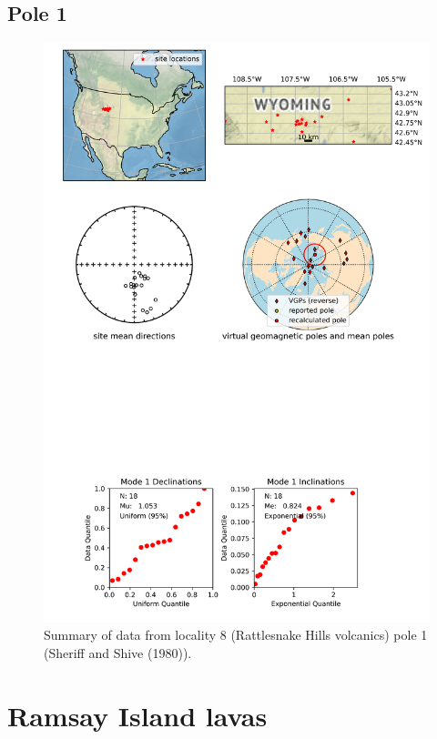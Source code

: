 \subsection{Pole 1}


\begin{figure}[H]
\centering
\includegraphics[width=5 in]{./8/1/pole_summary.png}
\caption{Summary of data from locality 8 (Rattlesnake Hills volcanics) pole 1 (Sheriff and Shive (1980)).}
\end{figure}

\section{Ramsay Island lavas}
